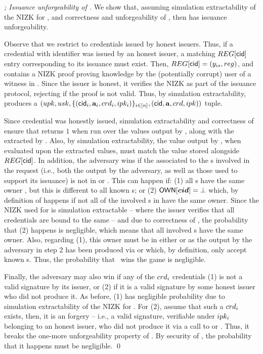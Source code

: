 \begin{proof}[; Issuance unforgeability of \CUASGen]
  We show that, assuming simulation extractability of the NIZK for \RelIss, and
  correctness and unforgeability of \SBCM, then \CUASGen has issuance
  unforgeability.

  Observe that we restrict to credentials issued by honest issuers. Thus, if a
  credential with identifier \cid was issued by an honest issuer, a matching
  $\trans[\cid]$ entry corresponding to its issuance must exist.
  Then, $\trans[\cid] = (\yissue,\utrans)$, and \utrans contains a NIZK proof
  \NIZKproof proving knowledge by the (potentially corrupt) user of a witness in
  \RelIss. Since the issuer is honest, it verifies the NIZK as part of the
  issuance protocol, rejecting if the proof is not valid. Thus, by simulation
  extractability, \ExtractIssue produces a $(upk,usk,\lbrace (\mathsf{cid}_i,\mathbf{a}_i,
  crd_i,ipk_i) \rbrace_{i\in[n]},(\mathsf{cid},\mathbf{a},crd,ipk))$ tuple.

  Since credential \cid was honestly issued, simulation extractability and
  correctness of \SBCM ensure that \VerCred returns $1$ when run over the values
  output by \adv, along with the \usk extracted by \ExtractIssue. Also, by
  simulation extractability, the value output by \fissue, when evaluated upon
  the extracted values, must match the \yissue value stored alongside
  $\trans[\cid]$.
  In addition, the adversary wins if the \uid associated to the {\cid}s involved
  in the request (i.e., both the \cid output by the adversary, as well as those
  used to support its issuance) is not in \HU or \CU. This can happen if: (1)
  all {\cid}s have the same owner \uid, but this \uid is different to all known
  {\uid}s; or (2) $\mathsf{OWN}[\boldsymbol{cid}] = \bot$ which, by definition of \OWNR happens if
  not all of the involved {\cid}s in \scid have the same owner. Since the NIZK
  used for \RelIss is simulation extractable -- where the issuer verifies that
  all credentials are bound to the same \usk -- and due to correctness of \SBCM,
  the probability that (2) happens is negligible, which means that all involved
  {\cid}s have the same owner. Also, regarding (1), this owner must be in either
  \HU or \CU as the \cid output by the adversary in step 2 has been produced via
  \ISSUE or \OBTISS which, by definition, only accept known {\uid}s. Thus, the
  probability that \adv~wins the \ExpForgeIssue game is negligible.

  Finally, the adversary may also win if any of the $crd_i$ credentials (1) is
  not a valid signature by its issuer, or (2) if it is a valid signature by some
  honest issuer who did not produce it. As before, (1) has negligible
  probability due to simulation extractability of the NIZK for \RelIss. For (2),
  assume that such a $crd_i$ exists, then, it is an \SBCM forgery -- i.e., a
  valid signature, verifiable under $ipk_i$ belonging to an honest issuer, who
  did not produce it via a call to \OBTISS or \ISSUE. Thus, it breaks the
  one-more unforgeability property of \SBCM. By security of \SBCM, the
  probability that it happens must be negligible.
  \qed
\end{proof}


